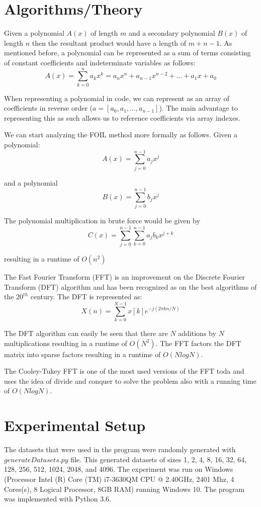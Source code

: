 \documentclass[12pt]{article}
\begin{document}
        \section{Algorithms/Theory}
        \indent\par{Given a polynomial $A(x)$ of length $m$ and a secondary polynomial $B(x)$ of length $n$ then the resultant product would have a length of $m+n-1$. As mentioned before, a polynomial can be represented as a sum of terms consisting of constant coefficients and indeterminate variables as follows: }
        $$A(x) = \sum_{k=0}^{n}a_kx^k = a_nx^n + a_{n-1}x^{n-2} + ... + a_1x + a_0$$
        \indent\par{When representing a polynomial in code, we can represent as an array of coefficients in reverse order ($a = [a_0,a_1,...,a_{n-1}]$). The main advantage to representing this as such allows us to reference coefficients via array indexes. }
        \indent\par{We can start analyzing the FOIL method more formally as follows. Given a polynomial:}
        $$ A(x)=\sum_{j=0}^{n-1}a_jx^j $$
        \par{and a polynomial}
        $$ B(x) =\sum_{j=0}^{n-1} b_jx^j $$
        \par{The polynomial multiplication in brute force would be given by }
        $$ C(x)=\sum_{j=0}^{n-1}\sum_{k=0}^{n-1}a_jb_kx^{j+k} $$
        \par{resulting in a runtime of $O(n^2)$}
        \indent\par{The Fast Fourier Transform (FFT) is an improvement on the Discrete Fourier Transform (DFT) algorithm and has been recognized as on the best algorithms of the $20^{th}$ century\cite{dongarra2000guest}. The DFT is represented as: }
        $$X(n)=\sum_{k=0}^{N-1}x[k]e^{-j(2\pi kn/N)}$$
        \indent\par{The DFT algorithm can easily be seen that there are $N$ additions by $N$ multiplications resulting in a runtime of $O(N^2)$. The FFT factors the DFT matrix into sparse factors resulting in a runtime of $O(N log N)$.}
        \indent\par{The Cooley-Tukey FFT \cite{CooleyT59:online} \cite{cochran1967fast} is one of the most used versions of the FFT toda and uses the idea of divide and conquer to solve the problem also with a running time of $O(N log N)$.}
        \section{Experimental Setup}
        \indent\par{The datasets that were used in the program were randomly generated with $generateDatasets.py$ file. This generated datasets of sizes 1, 2, 4, 8, 16, 32, 64, 128, 256, 512, 1024, 2048, and 4096. The experiment was run on Windows (Processor Intel (R) Core (TM) i7-3630QM CPU @ 2.40GHz, 2401 Mhz, 4 Cores(s), 8 Logical Processor, 8GB RAM) running Windows 10. The program was implemented with Python 3.6.}
\end{document}
